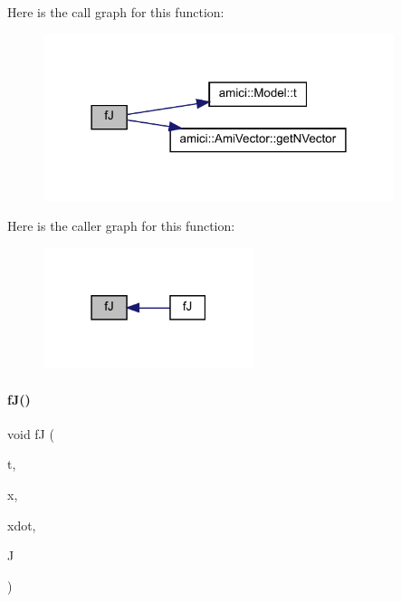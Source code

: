 Here is the call graph for this function\+:
\nopagebreak
\begin{figure}[H]
\begin{center}
\leavevmode
\includegraphics[width=290pt]{classamici_1_1_model___o_d_e_a99337eaeac6c70528c3464affe13df2e_cgraph}
\end{center}
\end{figure}
Here is the caller graph for this function\+:
\nopagebreak
\begin{figure}[H]
\begin{center}
\leavevmode
\includegraphics[width=174pt]{classamici_1_1_model___o_d_e_a99337eaeac6c70528c3464affe13df2e_icgraph}
\end{center}
\end{figure}
\mbox{\label{classamici_1_1_model___o_d_e_aa2c40d6808a333eee2a96e6737d85161}} 
\paragraph{\texorpdfstring{f\+J()}{fJ()}\hspace{0.1cm}{\footnotesize\ttfamily [2/3]}}
{\footnotesize\ttfamily void fJ (\begin{DoxyParamCaption}\item[{\mbox{\hyperlink{namespaceamici_a1bdce28051d6a53868f7ccbf5f2c14a3}{realtype}}}]{t,  }\item[{N\+\_\+\+Vector}]{x,  }\item[{N\+\_\+\+Vector}]{xdot,  }\item[{Dls\+Mat}]{J }\end{DoxyParamCaption})}

